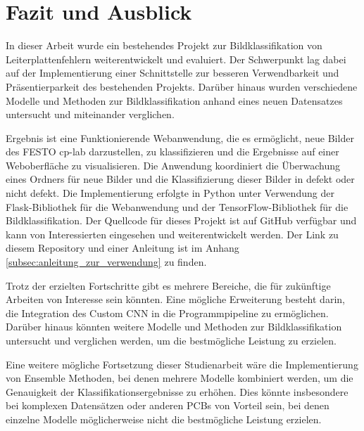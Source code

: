 
\chapter{Fazit und Ausblick} \label{chap:fazit_und_ausblick}

In dieser Arbeit wurde ein bestehendes Projekt zur Bildklassifikation von Leiterplattenfehlern weiterentwickelt und evaluiert. Der Schwerpunkt lag dabei auf der Implementierung einer Schnittstelle zur besseren Verwendbarkeit und Präsentierparkeit des bestehenden Projekts. Darüber hinaus wurden verschiedene Modelle und Methoden zur Bildklassifikation anhand eines neuen Datensatzes untersucht und miteinander verglichen.

Ergebnis ist eine Funktionierende Webanwendung, die es ermöglicht, neue Bilder des FESTO \ac{cp-lab} darzustellen, zu klassifizieren und die Ergebnisse auf einer Weboberfläche zu visualisieren. Die Anwendung koordiniert die Überwachung eines Ordners für neue Bilder und die Klassifizierung dieser Bilder in defekt oder nicht defekt. Die Implementierung erfolgte in Python unter Verwendung der Flask-Bibliothek für die Webanwendung und der TensorFlow-Bibliothek für die Bildklassifikation. Der Quellcode für dieses Projekt ist auf GitHub verfügbar und kann von Interessierten eingesehen und weiterentwickelt werden. Der Link zu diesem Repository und einer Anleitung ist im Anhang \autoref{subsec:anleitung_zur_verwendung} zu finden.

Trotz der erzielten Fortschritte gibt es mehrere Bereiche, die für zukünftige Arbeiten von Interesse sein könnten. Eine mögliche Erweiterung besteht darin, die Integration des Custom CNN in die Programmpipeline zu ermöglichen. Darüber hinaus könnten weitere Modelle und Methoden zur Bildklassifikation untersucht und verglichen werden, um die bestmögliche Leistung zu erzielen.

Eine weitere mögliche Fortsetzung dieser Studienarbeit wäre die Implementierung von Ensemble Methoden, bei denen mehrere Modelle kombiniert werden, um die Genauigkeit der Klassifikationsergebnisse zu erhöhen. Dies könnte insbesondere bei komplexen Datensätzen oder anderen \ac{PCB}s von Vorteil sein, bei denen einzelne Modelle möglicherweise nicht die bestmögliche Leistung erzielen.

